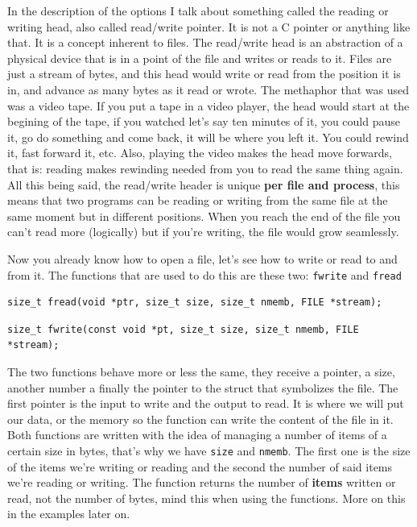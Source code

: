 \documentclass[a4paper]{article}
\begin{document}
In the description of the options I talk about something called the reading or
writing head, also called read/write pointer. It is not a C pointer or anything
like that. It is a concept inherent to files. The read/write head is an abstraction
of a physical device that is in a point of the file and writes or reads to it.
Files are just a stream of bytes, and this head would write or read from the
position it is in, and advance as many bytes as it read or wrote. The methaphor
that was used was a video tape. If you put a tape in a video player, the head
would start at the begining of the tape, if you watched let's say ten minutes
of it, you could pause it, go do something and come back, it will be where you
left it. You could rewind it, fast forward it, etc. Also, playing the video
makes the head move forwards, that is: reading makes rewinding needed from you
to read the same thing again.
All this being said, the read/write header is unique \textbf{per
file and process}, this means that two programs can be reading or writing from
the same file at the same moment but in different positions.
When you reach the end of the file you can't
read more (logically) but if you're writing, the file would grow seamlessly.

Now you already know how to open a file, let's see how to write or read to and
from it. The functions that are used to do this are these two: \verb!fwrite!
and \verb!fread!

\noindent
\begin{minipage}[H]{\linewidth}
\mbox{}
\begin{lstlisting}[style=C,
caption={\texttt{fread} function signature},
label={lst:freadSignature}]
size_t fread(void *ptr, size_t size, size_t nmemb, FILE *stream);
\end{lstlisting}
\end{minipage}

\noindent
\begin{minipage}[H]{\linewidth}
\mbox{}
\begin{lstlisting}[style=C,
caption={\texttt{fwrite} function signature},
label={lst:fwriteSignature}]
size_t fwrite(const void *pt, size_t size, size_t nmemb, FILE *stream);
\end{lstlisting}
\end{minipage}

The two functions behave more or less the same, they receive a pointer, a size,
another number a finally the pointer to the struct that symbolizes the file.
The first pointer is the input to write and the output to read. It is where we
will put our data, or the memory so the function can write the content
of the file in it. Both functions are
written with the idea of managing a number of items of a certain size in
bytes, that's why we have \verb!size! and \verb!nmemb!. The first one is the
size of the items we're writing or reading and the second the number
of said items we're reading or writing. The function returns the number of
\textbf{items} written or read, not the number of bytes, mind this when
using the functions.
More on this in the examples later on.
\end{document}
